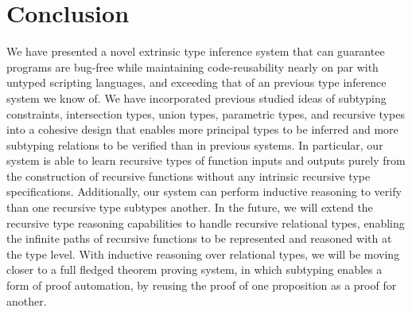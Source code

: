 \documentclass[acmsmall]{acmart}
\theoremstyle{definition}
\begin{document}



\section{Conclusion}
\label{sec:conclusion}
We have presented a novel extrinsic type inference system
that can guarantee programs are bug-free while maintaining
code-reusability nearly on par with untyped scripting languages,
and exceeding that of an previous type inference system we know of.  
We have incorporated previous studied ideas of subtyping constraints,
intersection types, union types, parametric types, and recursive types into
a cohesive design that enables more principal types to be inferred 
and more subtyping relations to be verified than in previous systems. 
In particular, our system is able to learn recursive types of function inputs
and outputs purely from the construction of recursive functions without 
any intrinsic recursive type specifications.
Additionally, our system can perform inductive reasoning to
verify than one recursive type subtypes another.
In the future, we will extend the recursive type reasoning capabilities
to handle recursive relational types, enabling the infinite paths
of recursive functions to be represented and reasoned with at the type level. 
With inductive reasoning over relational types, we will be
moving closer to a full fledged theorem proving system,
in which subtyping enables a form of proof automation,
by reusing the proof of one proposition as a proof for another. 

\newpage

\begin{thebibliography}{9}




\end{thebibliography}
\end{document}

